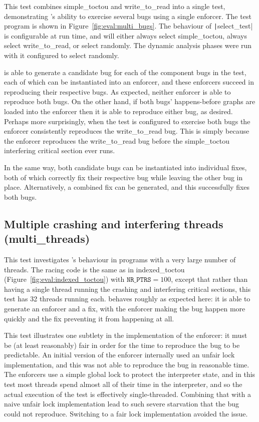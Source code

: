 This test combines simple\_toctou and write\_to\_read into a single
test, demonstrating {\technique}'s ability to exercise several bugs
using a single enforcer.  The test program is shown in
Figure~\ref{fig:eval:multi_bugs}.  The behaviour of
\texttt|select\_test| is configurable at run time, and will either
always select simple\_toctou, always select write\_to\_read, or select
randomly.  The dynamic analysis phases were run with it configured to
select randomly.

{\Implementation} is able to generate a candidate bug for each of the
component bugs in the test, each of which can be instantiated into an
enforcer, and these enforcers succeed in reproducing their respective
bugs.  As expected, neither enforcer is able to reproduce both bugs.
On the other hand, if both bugs' happens-before graphs are loaded into
the enforcer then it is able to reproduce either bug, as desired.
Perhaps more surprisingly, when the test is configured to exercise
both bugs the enforcer consistently reproduces the write\_to\_read
bug.  This is simply because the enforcer reproduces the
write\_to\_read bug before the simple\_toctou interfering critical
section ever runs.

In the same way, both candidate bugs can be instantiated into
individual fixes, both of which correctly fix their respective bug
while leaving the other bug in place.  Alternatively, a combined fix
can be generated, and this successfully fixes both bugs.

\subsection{Multiple crashing and interfering threads (multi\_threads)}

This test investigates {\implementation}'s behaviour in programs with
a very large number of threads.  The racing code is the same as in
indexed\_toctou (Figure~\ref{fig:eval:indexed_toctou}) with
$\texttt{NR\_PTRS} = 100$, except that rather than having a single
thread running the crashing and interfering critical sections, this
test has 32 threads running each.  {\Technique} behaves roughly as
expected here: it is able to generate an enforcer and a fix, with the
enforcer making the bug happen more quickly and the fix preventing it
from happening at all.

This test illustrates one subtlety in the implementation of the
enforcer: it must be (at least reasonably) fair in order for the time
to reproduce the bug to be predictable.  An initial version of the
enforcer internally used an unfair lock implementation, and this was
not able to reproduce the bug in reasonable time.  The
{\implementation} enforcers use a simple global lock to protect the
interpreter state, and in this test most threads spend almost all of
their time in the interpreter, and so the actual execution of the test
is effectively single-threaded.  Combining that with a naive unfair
lock implementation lead to such severe starvation that the bug could
not reproduce.  Switching to a fair lock implementation avoided the
issue.

